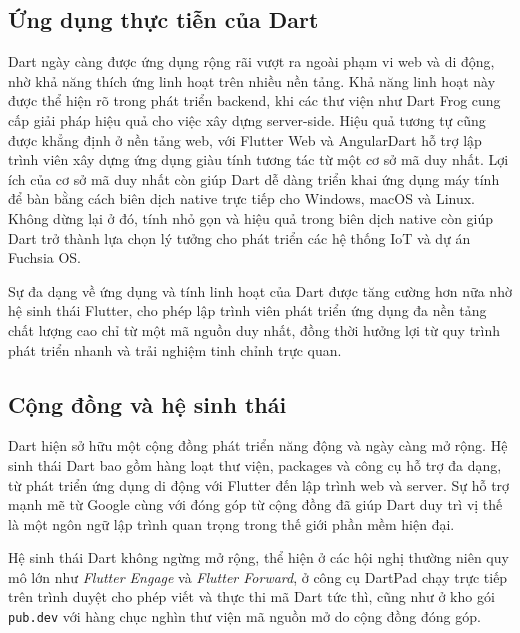 \documentclass[../DoAn.tex]{subfiles}
\numberwithin{figure}{chapter}
\begin{document}
\subsection{Ứng dụng thực tiễn của Dart}

Dart ngày càng được ứng dụng rộng rãi vượt ra ngoài phạm vi web và di động, nhờ khả năng thích ứng linh hoạt trên nhiều nền tảng. Khả năng linh hoạt này được thể hiện rõ trong phát triển backend, khi các thư viện như Dart Frog cung cấp giải pháp hiệu quả cho việc xây dựng server-side. Hiệu quả tương tự cũng được khẳng định ở nền tảng web, với Flutter Web và AngularDart hỗ trợ lập trình viên xây dựng ứng dụng giàu tính tương tác từ một cơ sở mã duy nhất. Lợi ích của cơ sở mã duy nhất còn giúp Dart dễ dàng triển khai ứng dụng máy tính để bàn bằng cách biên dịch native trực tiếp cho Windows, macOS và Linux. Không dừng lại ở đó, tính nhỏ gọn và hiệu quả trong biên dịch native còn giúp Dart trở thành lựa chọn lý tưởng cho phát triển các hệ thống IoT và dự án Fuchsia OS.

Sự đa dạng về ứng dụng và tính linh hoạt của Dart được tăng cường hơn nữa nhờ hệ sinh thái Flutter, cho phép lập trình viên phát triển ứng dụng đa nền tảng chất lượng cao chỉ từ một mã nguồn duy nhất, đồng thời hưởng lợi từ quy trình phát triển nhanh và trải nghiệm tinh chỉnh trực quan.



\subsection{Cộng đồng và hệ sinh thái}
Dart hiện sở hữu một cộng đồng phát triển năng động và ngày càng mở rộng. Hệ sinh thái Dart bao gồm hàng loạt thư viện, packages và công cụ hỗ trợ đa dạng, từ phát triển ứng dụng di động với Flutter đến lập trình web và server. Sự hỗ trợ mạnh mẽ từ Google cùng với đóng góp từ cộng đồng đã giúp Dart duy trì vị thế là một ngôn ngữ lập trình quan trọng trong thế giới phần mềm hiện đại.


Hệ sinh thái Dart không ngừng mở rộng, thể hiện ở các hội nghị thường niên quy mô lớn như \textit{Flutter Engage} và \textit{Flutter Forward}, ở công cụ DartPad chạy trực tiếp trên trình duyệt cho phép viết và thực thi mã Dart tức thì, cũng như ở kho gói \texttt{pub.dev} với hàng chục nghìn thư viện mã nguồn mở do cộng đồng đóng góp.
\end{document}
